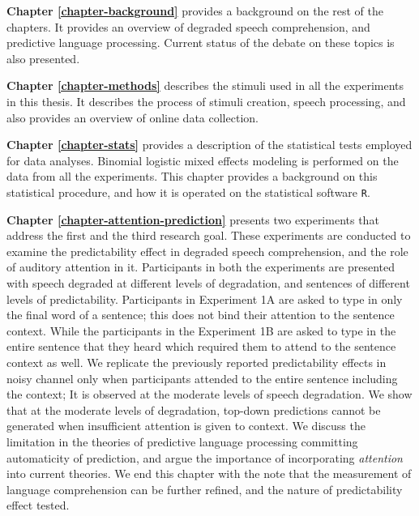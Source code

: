 \documentclass[a4paper, nobind]{templates/ociamthesis}
\begin{document}
\noindent
\textbf{Chapter \ref{chapter-background}} provides a background on the rest of the chapters.
It provides an overview of degraded speech comprehension, and predictive language processing.
Current status of the debate on these topics is also presented.

\noindent
\textbf{Chapter \ref{chapter-methods}} describes the stimuli used in all the experiments in this thesis.
It describes the process of stimuli creation, speech processing, and also provides an overview of online data collection.

\noindent
\textbf{Chapter \ref{chapter-stats}} provides a description of the statistical tests employed for data analyses.
Binomial logistic mixed effects modeling is performed on the data from all the experiments.
This chapter provides a background on this statistical procedure,
and how it is operated on the statistical software \texttt{R}.

\noindent
\textbf{Chapter \ref{chapter-attention-prediction}} presents two experiments that address the first and the third research goal.
These experiments are conducted to examine the predictability effect in degraded speech comprehension,
and the role of auditory attention in it.
Participants in both the experiments are presented with speech degraded at different levels of degradation,
and sentences of different levels of predictability.
Participants in Experiment 1A are asked to type in only the final word of a sentence;
this does not bind their attention to the sentence context.
While the participants in the Experiment 1B are asked to type in the entire sentence that they heard which required them to attend to the sentence context as well.
We replicate the previously reported predictability effects in noisy channel only when participants attended to the entire sentence including the context;
It is observed at the moderate levels of speech degradation.
We show that at the moderate levels of degradation, top-down predictions cannot be generated when insufficient attention is given to context.
We discuss the limitation in the theories of predictive language processing committing automaticity of prediction,
and argue the importance of incorporating \emph{attention} into current theories.
We end this chapter with the note that the measurement of language comprehension can be further refined,
and the nature of predictability effect tested.
\end{document}
